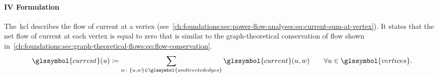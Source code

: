 \paragraph{IV Formulation}
\label{ch:foundations:iv-formulations}
% 
The~\gls{kcl} describes the flow of current at a vertex
(see~\cref{ch:foundations:sec:power-flow-analyses:eq:current-sum-at-vertex}). It
states that the net flow of current at each vertex is equal to zero that is
similar to the graph-theoretical conservation of flow shown
in~\cref{ch:foundations:sec:graph-theoretical-flows:eq:flow-conservation}.
% 
\begin{align}
    \glssymbol{current}(\vertexa) 
    \coloneqq
    \sum_{\vertexc\colon\{\vertexa,\vertexc\}\in\glssymbol{undirectededges}} 
    \glssymbol{current}(\vertexa,\vertexc)
    \qquad
    \forall\vertexa\in\glssymbol{vertices}.
    \label{ch:foundations:sec:power-flow-analyses:eq:current-sum-at-vertex}
\end{align}

